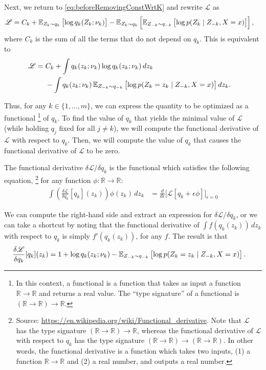 \documentclass[11pt]{article}
\newcommand{\sL}{\mathscr{L}}
\begin{document}
Next, we return to \eqref{eq:beforeRemovingConstWrtK} and rewrite $\sL$ as
\begin{align}
\sL
&= C_k
    + \expectOver{Z_k \sim q_k}{\log q_k(Z_k; \nu_k)}
    - \expectOver{Z_k \sim q_k}{ \expectOver{Z_{-k} \sim q_{-k}}{ \log p(Z_k \mid Z_{-k}, X = x) } },
\end{align}
where $C_k$ is the sum of all the terms that do not depend on $q_k$.
This is equivalent to
\begin{align}
\sL
&= \begin{aligned}[t]
    & C_k + \int
       q_k(z_k; \nu_k) \log q_k(z_k; \nu_k) \, dz_k \\
    & - \int q_k(z_k; \nu_k) \, \expectOver{Z_{-k} \sim q_{-k}}{ \log p(Z_k = z_k \mid Z_{-k}, X = x) } dz_k.
    \end{aligned}
\end{align}

Thus, for any $k \in \{1, \ldots, m\}$, we can express the quantity to be optimized as a functional%
\footnote{In this context, a functional is a function that takes as input a function ${\mathbb R \to \mathbb R}$ and returns a real value.  The ``type signature'' of a functional is ${(\mathbb R \to \mathbb R) \to \mathbb R}$.}
of $q_k$.
To find the value of $q_k$ that yields the minimal value of $\sL$ (while holding $q_j$ fixed for all $j \neq k$), we will compute the functional derivative of $\sL$ with respect to $q_k$.
Then, we will compute the value of $q_k$ that causes the functional derivative of $\sL$ to be zero.

The functional derivative $\delta\sL / \delta q_k$ is the functional which satisfies the following equation,%
    \footnote{Source: \url{https://en.wikipedia.org/wiki/Functional_derivative}.
    Note that $\sL$ has the type signature ${(\mathbb R \to \mathbb R) \to \mathbb R}$, whereas the functional derivative of $\sL$ with respect to $q_k$ has the type signature ${(\mathbb R \to \mathbb R) \to (\mathbb R \to \mathbb R)}$.
    In other words, the functional derivative is a function which takes two inputs, (1) a function ${\mathbb R \to \mathbb R}$ and (2) a real number, and outputs a real number.}
for any function $\phi : \mathbb R \to \mathbb R$:%
\begin{align}
\int \left( \frac{\delta \sL}{\delta q_k}[q_k](z_k) \right) \phi(z_k) \, dz_k
&=
\frac{d}{d\epsilon} \biggl[
    \sL[q_k + \epsilon \phi]
\biggr]_{\epsilon = 0}
\end{align}

We can compute the right-hand side and extract an expression for $\delta\sL / \delta q_k$, or we can take a shortcut by noting that the functional derivative of $\int f(q_k(z_k)) \, dz_k$ with respect to $q_k$ is simply $f'(q_k(z_k))$, for any $f$.
The result is that
\begin{align}
\frac{\delta \sL}{\delta q_k}[q_k](z_k)
&= 1 + \log q_k(z_k; \nu_k)
- \expectOver{Z_{-k} \sim q_{-k}}{ \log p(Z_k = z_k \mid Z_{-k}, X = x) }.
\end{align}
\end{document}
